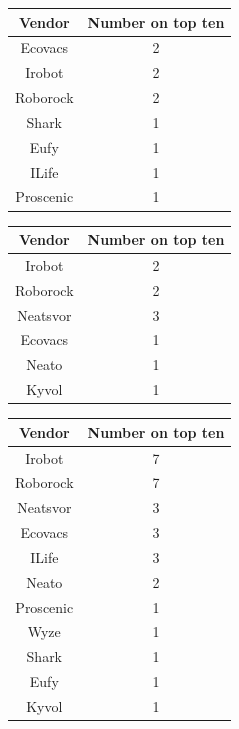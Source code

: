 \begin{table}[]
\begin{tabular}{|c|c|}
\hline
Vendor    & Number on top ten \\ \hline
Ecovacs   & 2                 \\ \hline
Irobot    & 2                 \\ \hline
Roborock  & 2                 \\ \hline
Shark     & 1                 \\ \hline
Eufy      & 1                 \\ \hline
ILife     & 1                 \\ \hline
Proscenic & 1                 \\ \hline
\end{tabular}
\end{table}

\begin{table}[]
\begin{tabular}{|c|c|}
\hline
Vendor   & Number on top ten \\ \hline
Irobot   & 2                 \\ \hline
Roborock & 2                 \\ \hline
Neatsvor & 3                 \\ \hline
Ecovacs  & 1                 \\ \hline
Neato    & 1                 \\ \hline
Kyvol    & 1                 \\ \hline
\end{tabular}
\end{table}

\begin{table}[]
\begin{tabular}{|c|c|}
\hline
Vendor    & Number on top ten \\ \hline
Irobot    & 7                 \\ \hline
Roborock  & 7                 \\ \hline
Neatsvor  & 3                 \\ \hline
Ecovacs   & 3                 \\ \hline
ILife     & 3                 \\ \hline
Neato     & 2                 \\ \hline
Proscenic & 1                 \\ \hline
Wyze      & 1                 \\ \hline
Shark     & 1                 \\ \hline
Eufy      & 1                 \\ \hline
Kyvol     & 1                 \\ \hline
\end{tabular}
\end{table}

